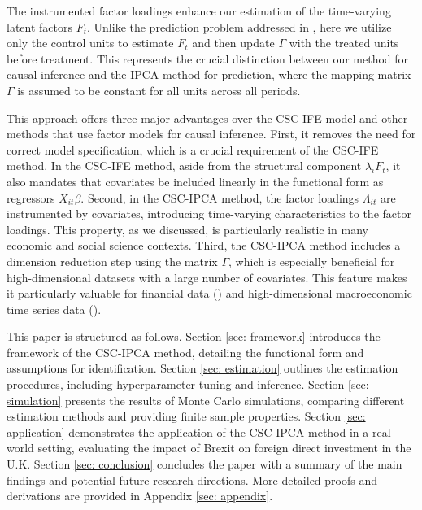 \documentclass[12pt]{article}
\begin{document}
The instrumented factor loadings enhance our estimation of the time-varying latent factors $F_t$. Unlike the prediction problem addressed in \cite{kelly2020instrumented,kelly2019characteristics}, here we utilize only the control units to estimate $F_t$ and then update $\Gamma$ with the treated units before treatment. This represents the crucial distinction between our method for causal inference and the IPCA method for prediction, where the mapping matrix $\Gamma$ is assumed to be constant for all units across all periods. 

This approach offers three major advantages over the CSC-IFE model and other methods that use factor models for causal inference. First, it removes the need for correct model specification, which is a crucial requirement of the CSC-IFE method. In the CSC-IFE method, aside from the structural component $\lambda_i F_t$, it also mandates that covariates be included linearly in the functional form as regressors $X_{it}\beta$. Second, in the CSC-IPCA method, the factor loadings $\Lambda_{it}$ are instrumented by covariates, introducing time-varying characteristics to the factor loadings. This property, as we discussed, is particularly realistic in many economic and social science contexts. Third, the CSC-IPCA method includes a dimension reduction step using the matrix $\Gamma$, which is especially beneficial for high-dimensional datasets with a large number of covariates. This feature makes it particularly valuable for financial data (\cite{feng2020taming}) and high-dimensional macroeconomic time series data (\cite{brave2009chicago}).

This paper is structured as follows. Section \ref{sec: framework} introduces the framework of the CSC-IPCA method, detailing the functional form and assumptions for identification. Section \ref{sec: estimation} outlines the estimation procedures, including hyperparameter tuning and inference. Section \ref{sec: simulation} presents the results of Monte Carlo simulations, comparing different estimation methods and providing finite sample properties. Section \ref{sec: application} demonstrates the application of the CSC-IPCA method in a real-world setting, evaluating the impact of Brexit on foreign direct investment in the U.K. Section \ref{sec: conclusion} concludes the paper with a summary of the main findings and potential future research directions. More detailed proofs and derivations are provided in Appendix \ref{sec: appendix}.

\end{document}
